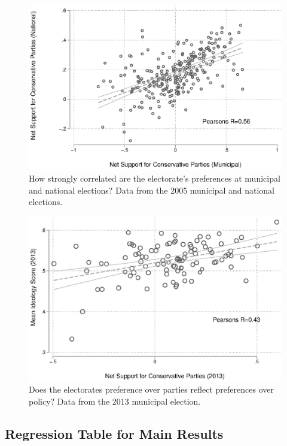 \documentclass[a4paper,12pt]{article}
\begin{document}
\begin{figure}[htbp]
	
	\includegraphics[width=1\textwidth]{validation2.eps}
	\caption{How strongly correlated are the electorate's preferences at municipal and national elections? Data from the 2005 municipal and national elections.} \label{validation2}
	
\end{figure}


\begin{figure}[htbp]
	\includegraphics[width=1\textwidth]{validation1.eps}
	\caption{Does the electorates preference over parties reflect preferences over policy? Data from the 2013 municipal election.} \label{validation1}
\end{figure}  
\clearpage

\subsection{Regression Table for Main Results}
\end{document}
